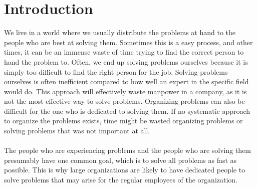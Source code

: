 \chapter{Introduction}
\label{sec:introduction}





We live in a world where we usually distribute the problems at hand to the people who are best at solving them. Sometimes this is a easy process, and other times, it can be an immense waste of time trying to find the correct person to hand the problem to. 
Often, we end up solving problems ourselves because it is simply too difficult to find the right person for the job. 
Solving problems ourselves is often inefficient compared to how well an expert in the specific field would do. 
This approach will effectively waste manpower in a company, as it is not the most effective way to solve problems.
Organizing problems can also be difficult for the one who is dedicated to solving them. 
If no systematic approach to organize the problems exists, time might be wasted organizing problems or solving problems that was not important at all.\\
\ \\
The people who are experiencing problems and the people who are solving them presumably have one common goal, which is to solve all problems as fast as possible. This is why large organizations are likely to have dedicated people to solve problems that may arise for the regular employees of the organization.


